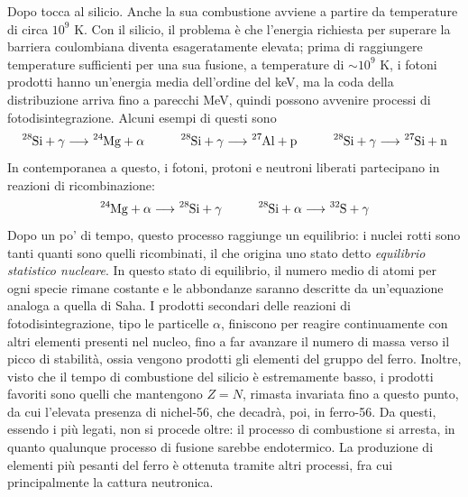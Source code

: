 \documentclass[11pt, a4paper]{scrartcl}
\theoremstyle{style}
\theoremstyle{style1}
\numberwithin{equation}{subsection}
\begin{document}
Dopo tocca al silicio. 
Anche la sua combustione avviene a partire da temperature di circa $10^9$ K.
Con il silicio, il problema \`e che l'energia richiesta per superare la barriera coulombiana diventa esageratamente elevata; prima di raggiungere temperature sufficienti per una sua fusione, a temperature di $\sim 10^9$ K, i fotoni prodotti hanno un'energia media dell'ordine del keV, ma la coda della distribuzione arriva fino a parecchi MeV, quindi possono avvenire processi di fotodisintegrazione. 
Alcuni esempi di questi sono
\[
	\ce{^{28}Si + \gamma} \longrightarrow \ce{^{24}Mg + \alpha } \hspace{1cm} \ce{^{28}Si + \gamma} \longrightarrow \ce{^{27}Al + p} \hspace{1cm}\ce{^{28}Si + \gamma} \longrightarrow \ce{^{27}Si + n}
\] 
In contemporanea a questo, i fotoni, protoni e neutroni liberati partecipano in reazioni di ricombinazione:
\[
	\ce{^{24}Mg + \alpha } \longrightarrow \ce{^{28}Si + \gamma} \hspace{1cm}\ce{^{28}Si + \alpha } \longrightarrow \ce{^{32}S + \gamma}
\] 
Dopo un po' di tempo, questo processo raggiunge un equilibrio: i nuclei rotti sono tanti quanti sono quelli ricombinati, il che origina uno stato detto \textit{equilibrio statistico nucleare}.
In questo stato di equilibrio, il numero medio di atomi per ogni specie rimane costante e le abbondanze saranno descritte da un'equazione analoga a quella di Saha.
I prodotti secondari delle reazioni di fotodisintegrazione, tipo le particelle $\alpha $, finiscono per reagire continuamente con altri elementi presenti nel nucleo, fino a far avanzare il numero di massa verso il picco di stabilit\`a, ossia vengono prodotti gli elementi del gruppo del ferro.
Inoltre, visto che il tempo di combustione del silicio \`e estremamente basso, i prodotti favoriti sono quelli che mantengono $Z=N$, rimasta invariata fino a questo punto, da cui l'elevata presenza di nichel-56, che decadr\`a, poi, in ferro-56.
Da questi, essendo i pi\`u legati, non si procede oltre: il processo di combustione si arresta, in quanto qualunque processo di fusione sarebbe endotermico.
La produzione di elementi pi\`u pesanti del ferro \`e ottenuta tramite altri processi, fra cui principalmente la cattura neutronica.
\end{document}
